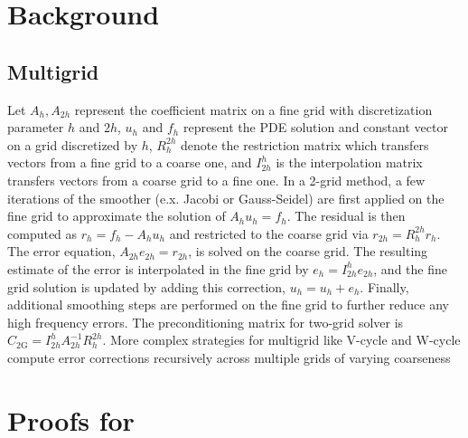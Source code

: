 \documentclass{article} %
\begin{document}










\appendix
\section{Background} \label{sec:appbackground}

\subsection{Multigrid} \label{sec:multigrid}

Let $A_h, A_{2h}$ represent the coefficient matrix on a fine grid with discretization parameter $h$ and $2h$, $u_h$ and $f_h$ represent the PDE solution and constant vector on a grid discretized by $h$, $R^{2h}_h$ denote the restriction matrix which transfers vectors from a fine grid to a coarse one, and $I^{h}_{2h}$ is the interpolation matrix transfers vectors from a coarse grid to a fine one. In a 2-grid method, a few iterations of the smoother (e.x. Jacobi or Gauss-Seidel) are first applied on the fine grid to approximate the solution of $A_hu_h = f_h$. The residual is then computed as $r_h = f_h - A_hu_h$ and restricted to the coarse grid via $r_{2h} = R^{2h}_hr_h$. The error equation, $A_{2h}e_{2h} = r_{2h}$, is solved on the coarse grid. The resulting estimate of the error is interpolated in the fine grid by $e_h = I^{h}_{2h}e_{2h}$, and the fine grid solution is updated by adding this correction, $u_h = u_h + e_h$. Finally, additional smoothing steps are performed on the fine grid to further reduce any high frequency errors. The preconditioning matrix for two-grid solver is $C_\mathrm{2G} = I^{h}_{2h}A_{2h}^{-1}R^{2h}_h$. More complex strategies for multigrid like V-cycle and W-cycle compute error corrections recursively across multiple grids of varying coarseness %

\section{Proofs for } \label{sec:proofgreedy}
\end{document}
